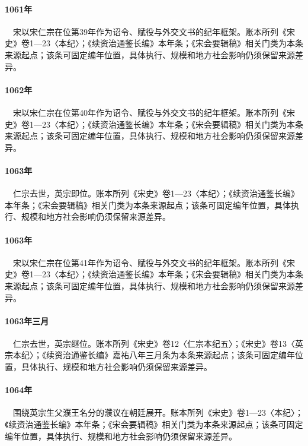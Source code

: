 \paragraph{1061年}　宋以宋仁宗在位第39年作为诏令、赋役与外交文书的纪年框架。账本所列《宋史》卷1—23〈本纪〉；《续资治通鉴长编》本年条；《宋会要辑稿》相关门类为本条来源起点；该条可固定编年位置，具体执行、规模和地方社会影响仍须保留来源差异。

\paragraph{1062年}　宋以宋仁宗在位第40年作为诏令、赋役与外交文书的纪年框架。账本所列《宋史》卷1—23〈本纪〉；《续资治通鉴长编》本年条；《宋会要辑稿》相关门类为本条来源起点；该条可固定编年位置，具体执行、规模和地方社会影响仍须保留来源差异。

\paragraph{1063年}　仁宗去世，英宗即位。账本所列《宋史》卷1—23〈本纪〉；《续资治通鉴长编》本年条；《宋会要辑稿》相关门类为本条来源起点；该条可固定编年位置，具体执行、规模和地方社会影响仍须保留来源差异。

\paragraph{1063年}　宋以宋仁宗在位第41年作为诏令、赋役与外交文书的纪年框架。账本所列《宋史》卷1—23〈本纪〉；《续资治通鉴长编》本年条；《宋会要辑稿》相关门类为本条来源起点；该条可固定编年位置，具体执行、规模和地方社会影响仍须保留来源差异。

\paragraph{1063年三月}　仁宗去世，英宗继位。账本所列《宋史》卷12〈仁宗本纪五〉；《宋史》卷13〈英宗本纪〉；《续资治通鉴长编》嘉祐八年三月条为本条来源起点；该条可固定编年位置，具体执行、规模和地方社会影响仍须保留来源差异。

\paragraph{1064年}　围绕英宗生父濮王名分的濮议在朝廷展开。账本所列《宋史》卷1—23〈本纪〉；《续资治通鉴长编》本年条；《宋会要辑稿》相关门类为本条来源起点；该条可固定编年位置，具体执行、规模和地方社会影响仍须保留来源差异。

